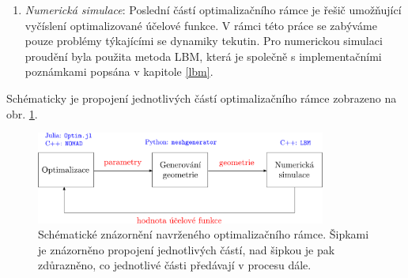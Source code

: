 \begin{enumerate}
	\item \textit{Numerická simulace}: Poslední částí optimalizačního rámce je řešič umožňující vyčíslení optimalizované účelové funkce. V rámci této práce se zabýváme pouze problémy týkajícími se dynamiky tekutin. Pro numerickou simulaci proudění byla použita metoda LBM, která je společně s implementačními poznámkami popsána v kapitole \ref{lbm}.
	
\end{enumerate}
Schématicky je propojení jednotlivých částí optimalizačního rámce zobrazeno na obr. \ref{fig:framework}.

\begin{figure}[H]
	\vspace{8mm}
	\centering
	\includegraphics[width=0.85\textwidth]{figures/framework.pdf}
	\vspace{7mm}
	\caption{Schématické znázornění navrženého optimalizačního rámce. Šipkami je znázorněno propojení jednotlivých částí, nad šipkou je pak zdůrazněno, co jednotlivé části předávají v procesu dále.}
	\label{fig:framework}
\end{figure}